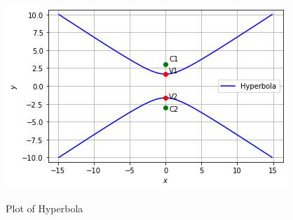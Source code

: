 \documentclass[journal,12pt,twocolumn]{IEEEtran}
\begin{document}
\begin{figure}[h!]
\centering
\includegraphics[width=\columnwidth]{hyperbolafig.png}
\label{fig:hyperbola}
\caption{Plot of Hyperbola}
\end{figure}
\end{document}

